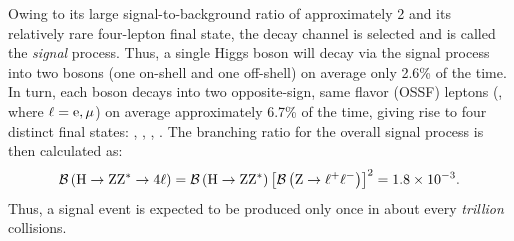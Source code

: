 Owing to its large signal-to-background ratio of approximately 2 and its relatively rare four-lepton final state, the \hzzfourl decay channel is selected and is called the \emph{signal} process.
Thus, a single Higgs boson will decay via the signal process into two \PZ bosons (one on-shell and one off-shell) on average only 2.6\% of the time.
In turn, each \PZ boson decays into two opposite-sign, same flavor (OSSF) leptons (\Ztolplm, where $\ell = \mathrm{e}, \mu$) on average approximately 6.7\% of the time, giving rise to four distinct final states:
\foure, \fourmu, \twoetwomu, \twomutwoe.
The branching ratio for the overall signal process is then calculated as: %
\begin{equation*}
    \BRof{\hzzfourl} = \BRof{\htozz} \left[ \BRof{\Ztolplm} \right]^2 = 1.8\tentotheminus{3}.
\end{equation*}
Thus, a signal event is expected to be produced only once in about every \emph{trillion} \pp collisions.

